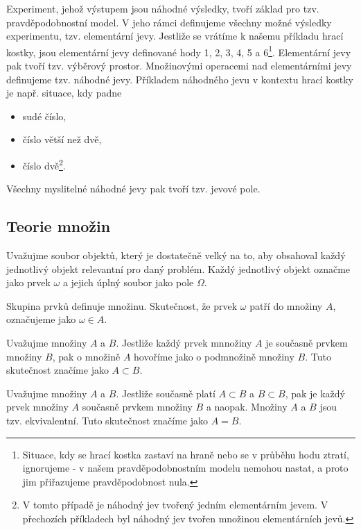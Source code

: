 Experiment, jehož výstupem jsou náhodné výsledky, tvoří základ pro tzv. pravděpodobnostní model. V jeho rámci definujeme všechny možné výsledky experimentu, tzv. elementární jevy. Jestliže se vrátíme k našemu příkladu hrací kostky, jsou elementární jevy definované hody 1, 2, 3, 4, 5 a 6\footnote{Situace, kdy se hrací kostka zastaví na hraně nebo se v průběhu hodu ztratí, ignorujeme - v našem pravděpodobnostním modelu nemohou nastat, a proto jim přiřazujeme pravděpodobnost nula.}. Elementární jevy pak tvoří tzv. výběrový prostor. Množinovými operacemi nad elementárními jevy definujeme tzv. náhodné jevy. Příkladem náhodného jevu v kontextu hrací kostky je např. situace, kdy padne
\begin{itemize}
\item sudé číslo,
\item číslo větší než dvě,
\item číslo dvě\footnote{V tomto případě je náhodný jev tvořený jedním elementárním jevem. V přechozích příkladech byl náhodný jev tvořen množinou elementárních jevů.}.
\end{itemize}
Všechny myslitelné náhodné jevy pak tvoří tzv. jevové pole.

\subsection{Teorie množin}

Uvažujme soubor objektů, který je dostatečně velký na to, aby obsahoval každý jednotlivý objekt relevantní pro daný problém. Každý jednotlivý objekt označme jako prvek $\omega$ a jejich úplný soubor jako pole $\Omega$.

Skupina prvků definuje množinu. Skutečnost, že prvek $\omega$ patří do množiny $A$, označujeme jako $\omega \in A$.

\begin{definition}[Podmnožina]
Uvažujme množiny $A$ a $B$. Jestliže každý prvek mnnožiny $A$ je současně prvkem množiny $B$, pak o množině $A$ hovoříme jako o podmnožině množiny $B$. Tuto skutečnost značíme jako $A \subset B$.
\end{definition}

\begin{definition}
Uvažujme množiny $A$ a $B$. Jestliže současně platí $A \subset B$ a $B \subset B$, pak je každý prvek množiny $A$ současně prvkem množiny $B$ a naopak. Množiny $A$ a $B$ jsou tzv. ekvivalentní. Tuto skutečnost značíme jako $A = B$.
\end{definition}

